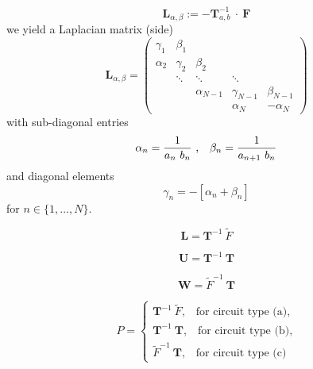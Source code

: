 \documentclass[a4paper, 10pt, twoside, twocolumn]{scrartcl}
\begin{document}
\begin{equation}
 	\mathbf{L}_{\alpha,\beta} := -\mathbf{T}_{a,b}^{-1} ~\cdot~ \mathbf{F}
\end{equation}
we yield a Laplacian matrix (side)
\begin{equation}
	\mathbf{L}_{\alpha,\beta} =
	\begin{pmatrix}
		\gamma_{1} & \beta_{1} \\
		\alpha_{2} & \gamma_{2} & \beta_{2} \\
		& \ddots & \ddots & \ddots \\
		& & \alpha_{N-1} & \gamma_{N-1} & \beta_{N-1} \\
		& & & \alpha_{N} & -\alpha_{N}
	\end{pmatrix}
\end{equation}
with sub-diagonal entries
\begin{equation}
	\alpha_{n} = \frac{1}{a_{n}~ b_{n}} ~ \text{,} \quad 
	\beta_{n} =  \frac{1}{a_{n+1}~ b_{n}} \\
\end{equation}
and diagonal elements
\begin{equation*}
	\gamma_{n} = -\left[\alpha_{n}+\beta_{n}\right]
\end{equation*}
for $n\in\{1,\ldots,N\}$.


\begin{equation}
	\mathbf{L} = \mathbf{T}^{-1} ~ \tilde{F} %
\end{equation}

\begin{equation}
	\mathbf{U} = \mathbf{T}^{-1} ~ \mathbf{T} %
\end{equation}

\begin{equation}
	\mathbf{W} = \tilde{F}^{-1} ~ \mathbf{T} %
\end{equation}



\begin{equation}
	P = \begin{cases}
		\mathbf{T}^{-1} ~ \tilde{F} \text{,} \quad \text{for circuit type (a),} \\
		\mathbf{T}^{-1} ~ \mathbf{T} \text{,} \quad \text{for circuit type (b),} \\
		\tilde{F}^{-1} ~ \mathbf{T} \text{,} \quad \text{for circuit type (c)}
	\end{cases}
\end{equation}
\end{document}
